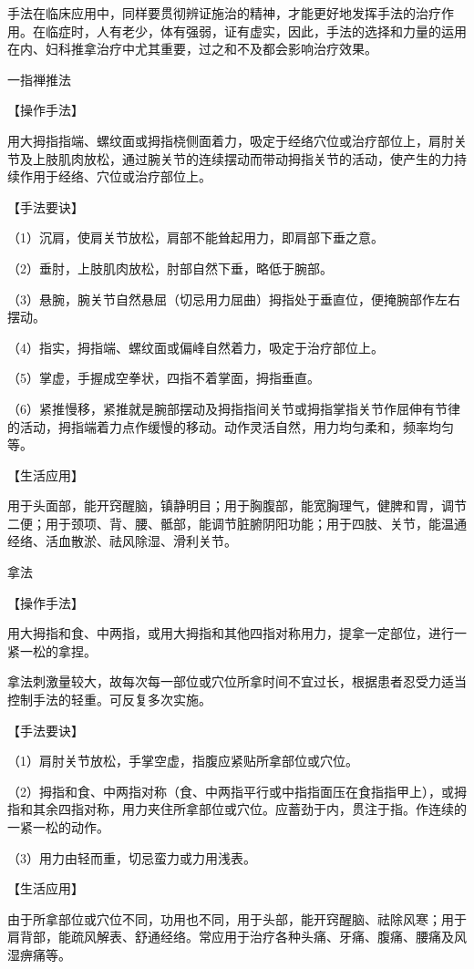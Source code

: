 \documentclass[12pt,UTF8]{ctexbook}
\begin{document}
手法在临床应用中，同样要贯彻辨证施治的精神，才能更好地发挥手法的治疗作用。在临症时，人有老少，体有强弱，证有虚实，因此，手法的选择和力量的运用在内、妇科推拿治疗中尤其重要，过之和不及都会影响治疗效果。

一指禅推法

【操作手法】

用大拇指指端、螺纹面或拇指桡侧面着力，吸定于经络穴位或治疗部位上，肩肘关节及上肢肌肉放松，通过腕关节的连续摆动而带动拇指关节的活动，使产生的力持续作用于经络、穴位或治疗部位上。

【手法要诀】

（1）沉肩，使肩关节放松，肩部不能耸起用力，即肩部下垂之意。

（2）垂肘，上肢肌肉放松，肘部自然下垂，略低于腕部。

（3）悬腕，腕关节自然悬屈（切忌用力屈曲）拇指处于垂直位，便掩腕部作左右摆动。

（4）指实，拇指端、螺纹面或偏峰自然着力，吸定于治疗部位上。

（5）掌虚，手握成空拳状，四指不着掌面，拇指垂直。

（6）紧推慢移，紧推就是腕部摆动及拇指指间关节或拇指掌指关节作屈伸有节律的活动，拇指端着力点作缓慢的移动。动作灵活自然，用力均匀柔和，频率均匀等。

【生活应用】

用于头面部，能开窍醒脑，镇静明目；用于胸腹部，能宽胸理气，健脾和胃，调节二便；用于颈项、背、腰、骶部，能调节脏腑阴阳功能；用于四肢、关节，能温通经络、活血散淤、祛风除湿、滑利关节。

拿法

【操作手法】

用大拇指和食、中两指，或用大拇指和其他四指对称用力，提拿一定部位，进行一紧一松的拿捏。

拿法刺激量较大，故每次每一部位或穴位所拿时间不宜过长，根据患者忍受力适当控制手法的轻重。可反复多次实施。

【手法要诀】

（1）肩肘关节放松，手掌空虚，指腹应紧贴所拿部位或穴位。

（2）拇指和食、中两指对称（食、中两指平行或中指指面压在食指指甲上），或拇指和其余四指对称，用力夹住所拿部位或穴位。应蓄劲于内，贯注于指。作连续的一紧一松的动作。

（3）用力由轻而重，切忌蛮力或力用浅表。

【生活应用】

由于所拿部位或穴位不同，功用也不同，用于头部，能开窍醒脑、祛除风寒；用于肩背部，能疏风解表、舒通经络。常应用于治疗各种头痛、牙痛、腹痛、腰痛及风湿痹痛等。
\end{document}
